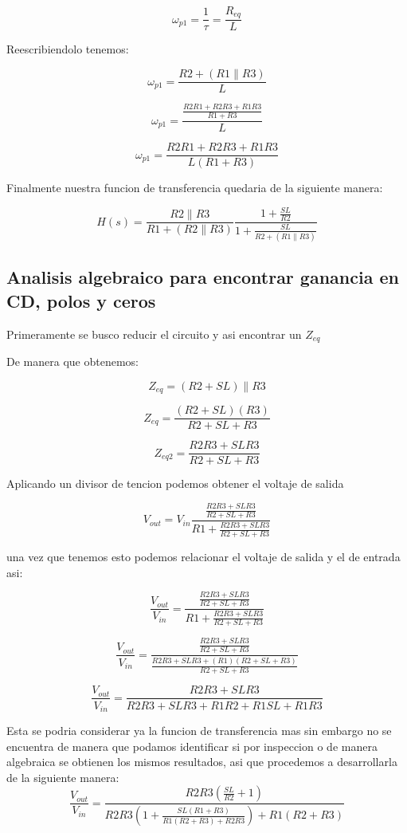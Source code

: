 \documentclass[12pt,letterpaper]{IEEEtran}
\begin{document}
	$$\omega_{p1}=\frac{1}{\tau}=\frac{R_{eq}}{L}$$
	
	Reescribiendolo tenemos:
	
	$$\omega_{p1}=\frac{R2+(R1\parallel R3)}{L}$$
	
	$$\omega_{p1}=\frac{\frac{R2R1+R2R3+R1R3}{R1+R3}}{L}$$
	
	$$\omega_{p1}=\frac{R2R1+R2R3+R1R3}{L(R1+R3)}$$
	
	Finalmente nuestra funcion de transferencia quedaria de la siguiente manera:
	
	$$H(s)=\frac{R2\parallel R3}{R1+(R2\parallel R3)}\frac{1+\frac{SL}{R2}}{1+\frac{SL}{R2+(R1\parallel R3)}}$$  
	
	\subsection{\textbf{Analisis algebraico para encontrar ganancia en CD, polos y ceros }}
	
	Primeramente se busco reducir el circuito y asi encontrar un $Z_{eq}$
	
	De manera que obtenemos:
	
	$$Z_{eq}=(R2+SL)\parallel R3$$
	
	$$Z_{eq}=\frac{(R2+SL)(R3)}{R2+SL+R3} $$ 
	
	$$Z_{eq2}=\frac{R2R3+SLR3}{R2+SL+R3}$$
	
	Aplicando un divisor de tencion podemos obtener el voltaje de salida 
	
	$$V_{out}=V_{in}\frac{\frac{R2R3+SLR3}{R2+SL+R3}}{R1+\frac{R2R3+SLR3}{R2+SL+R3}}$$
	
	una vez que tenemos esto podemos relacionar el voltaje de salida y el de entrada  asi:
	
	$$\frac{V_{out}}{V_{in}}=\frac{\frac{R2R3+SLR3}{R2+SL+R3}}{R1+\frac{R2R3+SLR3}{R2+SL+R3}}$$
	
	$$\frac{V_{out}}{V_{in}}=\frac{\frac{R2R3+SLR3}{R2+SL+R3}}{\frac{R2R3+SLR3+(R1)(R2+SL+R3)}{R2+SL+R3}}$$
	
	$$\frac{V_{out}}{V_{in}}=\frac{R2R3+SLR3}{R2R3+SLR3+R1R2+R1SL+R1R3}$$
	
	Esta se podria considerar ya la funcion de transferencia mas sin embargo no se encuentra de manera que podamos identificar si por inspeccion o de manera algebraica se obtienen los mismos resultados, asi que procedemos a desarrollarla de la siguiente manera:\\
	
	$$\frac{V_{out}}{V_{in}}=\frac{R2R3(\frac{SL}{R2}+1)}{R2R3(1+\frac{SL(R1+R3)}{R1(R2+R3)+R2R3})+R1(R2+R3)}$$
	
\end{document}
